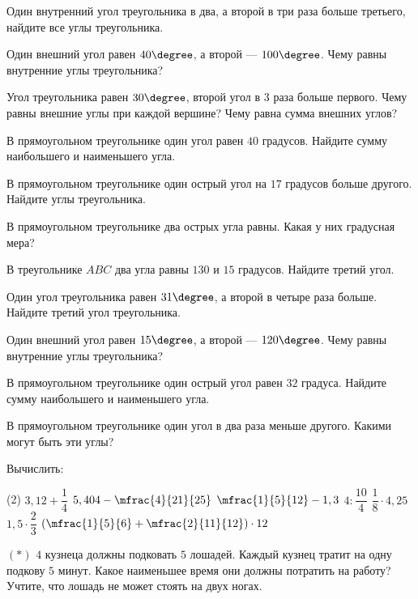 \begin{class}[number=1-2]
\begin{listofex}
		\item Один внутренний угол треугольника в два, а второй в три раза больше третьего, найдите все углы треугольника.
		\item Один внешний угол равен \( 40\degree \), а второй --- \( 100\degree \). Чему равны внутренние углы треугольника?
		\item Угол треугольника равен \( 30\degree \), второй угол в \( 3 \) раза больше первого. Чему равны внешние углы при каждой вершине? Чему равна сумма внешних углов?
		\item В прямоугольном треугольнике один угол равен \( 40 \) градусов. Найдите сумму наибольшего и наименьшего угла.
		\item В прямоугольном треугольнике один острый угол на \( 17 \) градусов больше другого. Найдите углы треугольника.
		\item В прямоугольном треугольнике два острых угла равны. Какая у них градусная мера?
	\end{listofex}
\end{class}


\begin{homework}[number=1]
	\begin{listofex}
		\item В треугольнике \( ABC \) два угла равны \( 130\) и \( 15 \) градусов. Найдите третий угол.
		\item Один угол треугольника равен \( 31\degree \), а второй в четыре раза больше. Найдите третий угол треугольника.
		\item Один внешний угол равен \( 15\degree \), а второй --- \( 120\degree \). Чему равны внутренние углы треугольника?
		\item В прямоугольном треугольнике один острый угол равен \( 32 \) градуса. Найдите сумму наибольшего и наименьшего угла.
		\item В прямоугольном треугольнике один угол в два раза меньше другого. Какими могут быть эти углы?
		\item Вычислить:
		\begin{tasks}(2)
			\task \( 3,12+\dfrac{1}{4} \)
			\task \( 5,404-\mfrac{4}{21}{25} \)
			\task \( \mfrac{1}{5}{12}-1,3\)
			\task \( 4 : \dfrac{10}{4} \)
			\task \( \dfrac{1}{8} \cdot 4,25 \)
			\task \( 1,5 \cdot \dfrac{2}{3} \)
			\task \( \left(  \mfrac{1}{5}{6} + \mfrac{2}{11}{12} \right) \cdot 12 \)
		\end{tasks}
		\item \( (*) \) \(4\) кузнеца должны подковать \(5\) лошадей. Каждый кузнец тратит на одну подкову \(5\) минут. Какое наименьшее время они должны потратить на работу? Учтите, что лошадь не может стоять на двух ногах.
	\end{listofex}
\end{homework}

